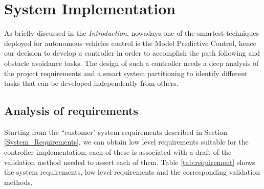 \section{System Implementation} \label{system_partitioning}
As briefly discussed in the \textit{Introduction}, nowadays one of the smartest techniques deployed for autonomous vehicles control is the Model Predictive Control, hence our decision to develop a controller in order to accomplish the path following and obstacle avoidance tasks.
The design of such a controller needs a deep analysis of the project requirements and a smart system partitioning to identify different tasks that can be developed independently from others.


\subsection{Analysis of requirements} \label{subsection:requirements}
Starting from the ``customer" system requirements described in Section \ref{System_Requirements}, we can obtain low level requirements suitable for the controller implementation; each of these is associated with a draft of the validation method needed to assert each of them. Table \ref{tab:requirement} shows the system requirements, low level requirements and the corresponding validation methods.

